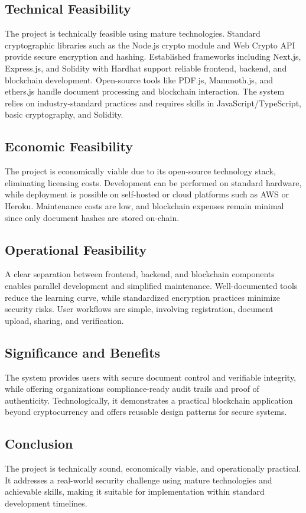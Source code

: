 \documentclass[12pt]{article}
\begin{document}
\subsection{Technical Feasibility}
The project is technically feasible using mature technologies. Standard cryptographic libraries such as the Node.js crypto module and Web Crypto API provide secure encryption and hashing. Established frameworks including Next.js, Express.js, and Solidity with Hardhat support reliable frontend, backend, and blockchain development. Open-source tools like PDF.js, Mammoth.js, and ethers.js handle document processing and blockchain interaction. The system relies on industry-standard practices and requires skills in JavaScript/TypeScript, basic cryptography, and Solidity.

\subsection{Economic Feasibility}
The project is economically viable due to its open-source technology stack, eliminating licensing costs. Development can be performed on standard hardware, while deployment is possible on self-hosted or cloud platforms such as AWS or Heroku. Maintenance costs are low, and blockchain expenses remain minimal since only document hashes are stored on-chain.

\subsection{Operational Feasibility}
A clear separation between frontend, backend, and blockchain components enables parallel development and simplified maintenance. Well-documented tools reduce the learning curve, while standardized encryption practices minimize security risks. User workflows are simple, involving registration, document upload, sharing, and verification.

\subsection{Significance and Benefits}
The system provides users with secure document control and verifiable integrity, while offering organizations compliance-ready audit trails and proof of authenticity. Technologically, it demonstrates a practical blockchain application beyond cryptocurrency and offers reusable design patterns for secure systems.

\subsection{Conclusion}
The project is technically sound, economically viable, and operationally practical. It addresses a real-world security challenge using mature technologies and achievable skills, making it suitable for implementation within standard development timelines.
\end{document}
